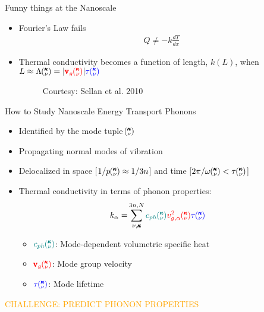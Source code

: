 \documentclass{beamer}
\newcommand{\kv}{\mspace{-4.0mu}\left(\mspace{-8.0mu}
\begin{smallmatrix}&\pmb{\kappa} \\&\nu\end{smallmatrix}
\mspace{-3.0mu}\right)}
\begin{document}
\begin{frame}{Funny things at the Nanoscale}
\begin{itemize}
\item Fourier's Law fails
\begin{equation}\label{EQ:NMD:qdot}
\begin{split}
Q\neq-k\frac{dT}{dx}
\end{split}
\end{equation}

\item Thermal conductivity becomes a function of length, $k(L)$, when $L \approx \Lambda \kv=|\textcolor{red}{\pmb{\mathrm{v}}_{g}\kv}|\textcolor{blue}{\tau\kv} $

\begin{figure}[t]
\begin{center}
\vspace*{-0.0cm}
\renewcommand{\figure}{Fig.}
\label{fig:CPU_scaling}
\caption{Courtesy: Sellan et al. 2010}
\end{center}
\end{figure}

\end{itemize}
\end{frame}

\begin{frame}{How to Study Nanoscale Energy Transport}
Phonons
\begin{itemize}
\item Identified by the mode tuple $\kv$
\item Propagating normal modes of vibration
\item Delocalized in space [$1/p\kv \approx 1/3n$] and time [$2 \pi /\omega \kv < \tau \kv$]
\item Thermal conductivity in terms of phonon properties:
\begin{equation}\label{EQ:M:conductivity}
\begin{split}
k_{\mathbf{\alpha}}=&\sum_{\nu,\pmb{\kappa}}^{3n,N} \textcolor{teal}{c_{ph}\kv}
\textcolor{red}{v^{2}_{g,\mathbf{\alpha}}\kv} \textcolor{blue}{\tau\kv}
\end{split}
\end{equation}
\begin{itemize}
\item $\textcolor{teal}{c_{ph}\kv}$: Mode-dependent volumetric specific heat
\item $\textcolor{red}{\pmb{\mathrm{v}}_{g}\kv}$: Mode group velocity
\item $\textcolor{blue}{\tau\kv}$: Mode lifetime
\end{itemize}

\end{itemize}
\textcolor{orange}{CHALLENGE: PREDICT PHONON PROPERTIES}
\end{frame}
\end{document}
